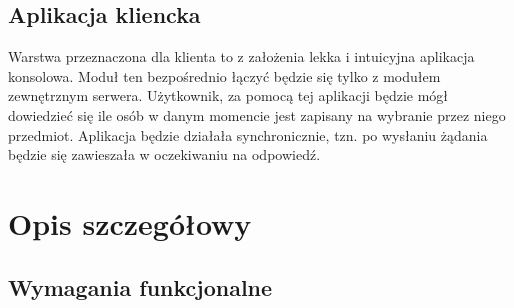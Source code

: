 \subsection*[Aplikacja kliencka]{Aplikacja kliencka}

\par{Warstwa przeznaczona dla klienta to z założenia lekka i intuicyjna aplikacja konsolowa. Moduł ten bezpośrednio łączyć będzie się tylko z modułem zewnętrznym serwera. Użytkownik, za pomocą tej aplikacji będzie mógł dowiedzieć się ile osób w danym momencie jest zapisany na wybranie przez niego przedmiot. Aplikacja będzie działała synchronicznie, tzn. po wysłaniu żądania będzie się zawieszała w oczekiwaniu na odpowiedź.}

\section[Opis szczegółowy]{Opis szczegółowy}

\subsection[Wymagania funkcjonalne]{Wymagania funkcjonalne}

